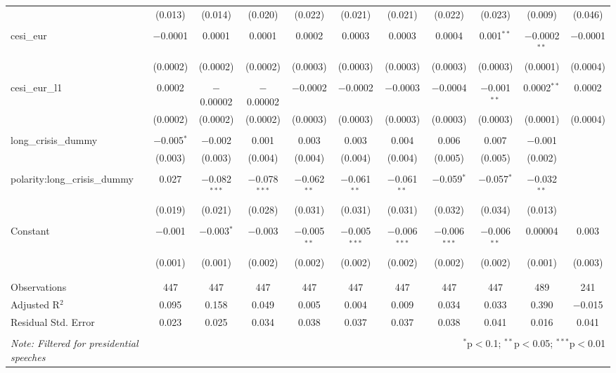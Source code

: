 \begin{table}[!htbp]
\begin{adjustbox}{width=1.35\textwidth}
\begin{tabular}{@{\extracolsep{5pt}}lcccccccccc}
  & (0.013) & (0.014) & (0.020) & (0.022) & (0.021) & (0.021) & (0.022) & (0.023) & (0.009) & (0.046) \\ 
  & & & & & & & & & & \\ 
 cesi\_eur & $-$0.0001 & 0.0001 & 0.0001 & 0.0002 & 0.0003 & 0.0003 & 0.0004 & 0.001$^{**}$ & $-$0.0002$^{**}$ & $-$0.0001 \\ 
  & (0.0002) & (0.0002) & (0.0002) & (0.0003) & (0.0003) & (0.0003) & (0.0003) & (0.0003) & (0.0001) & (0.0004) \\ 
  & & & & & & & & & & \\ 
 cesi\_eur\_l1 & 0.0002 & $-$0.00002 & $-$0.00002 & $-$0.0002 & $-$0.0002 & $-$0.0003 & $-$0.0004 & $-$0.001$^{**}$ & 0.0002$^{**}$ & 0.0002 \\ 
  & (0.0002) & (0.0002) & (0.0002) & (0.0003) & (0.0003) & (0.0003) & (0.0003) & (0.0003) & (0.0001) & (0.0004) \\ 
  & & & & & & & & & & \\ 
 long\_crisis\_dummy & $-$0.005$^{*}$ & $-$0.002 & 0.001 & 0.003 & 0.003 & 0.004 & 0.006 & 0.007 & $-$0.001 &  \\ 
  & (0.003) & (0.003) & (0.004) & (0.004) & (0.004) & (0.004) & (0.005) & (0.005) & (0.002) &  \\ 
  & & & & & & & & & & \\ 
 polarity:long\_crisis\_dummy & 0.027 & $-$0.082$^{***}$ & $-$0.078$^{***}$ & $-$0.062$^{**}$ & $-$0.061$^{**}$ & $-$0.061$^{**}$ & $-$0.059$^{*}$ & $-$0.057$^{*}$ & $-$0.032$^{**}$ &  \\ 
  & (0.019) & (0.021) & (0.028) & (0.031) & (0.031) & (0.031) & (0.032) & (0.034) & (0.013) &  \\ 
  & & & & & & & & & & \\ 
 Constant & $-$0.001 & $-$0.003$^{*}$ & $-$0.003 & $-$0.005$^{**}$ & $-$0.005$^{***}$ & $-$0.006$^{***}$ & $-$0.006$^{***}$ & $-$0.006$^{**}$ & 0.00004 & 0.003 \\ 
  & (0.001) & (0.001) & (0.002) & (0.002) & (0.002) & (0.002) & (0.002) & (0.002) & (0.001) & (0.003) \\ 
  & & & & & & & & & & \\ 
\hline \\[-1.8ex] 
Observations & 447 & 447 & 447 & 447 & 447 & 447 & 447 & 447 & 489 & 241 \\ 
Adjusted R$^{2}$ & 0.095 & 0.158 & 0.049 & 0.005 & 0.004 & 0.009 & 0.034 & 0.033 & 0.390 & $-$0.015 \\ 
Residual Std. Error & 0.023 & 0.025 & 0.034 & 0.038 & 0.037 & 0.037 & 0.038 & 0.041 & 0.016 & 0.041 \\ 
\hline 
\hline \\[-1.8ex] 
\textit{Note: Filtered for presidential speeches}  & \multicolumn{10}{r}{$^{*}$p$<$0.1; $^{**}$p$<$0.05; $^{***}$p$<$0.01} \\ 
\end{tabular} 
\end{adjustbox}
\end{table} 
